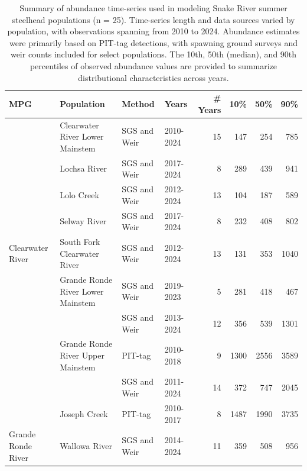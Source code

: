 \documentclass[12pt,a4paper]{article}
\begin{document}
\begin{table}
\centering
\caption{\label{tab:sth-obs}Summary of abundance time-series used in modeling Snake River summer steelhead populations (n = 25). Time-series length and data sources varied by population, with observations spanning from 2010 to 2024. Abundance estimates were primarily based on PIT-tag detections, with spawning ground surveys and weir counts included for select populations. The 10th, 50th (median), and 90th percentiles of observed abundance values are provided to summarize distributional characteristics across years.}
\centering
\fontsize{8}{10}\selectfont
\begin{tabular}[t]{llllrrrr}
\toprule
MPG & Population & Method & Years & \# Years & 10\% & 50\% & 90\%\\
\midrule
 & Clearwater River Lower Mainstem & SGS and Weir & 2010-2024 & 15 & 147 & 254 & 785\\

 & Lochsa River & SGS and Weir & 2017-2024 & 8 & 289 & 439 & 941\\

 & Lolo Creek & SGS and Weir & 2012-2024 & 13 & 104 & 187 & 589\\

 & Selway River & SGS and Weir & 2017-2024 & 8 & 232 & 408 & 802\\

\multirow[t]{-5}{*}[4\dimexpr\aboverulesep+\belowrulesep+\cmidrulewidth]{\raggedright\arraybackslash Clearwater River} & South Fork Clearwater River & SGS and Weir & 2012-2024 & 13 & 131 & 353 & 1040\\

 & Grande Ronde River Lower Mainstem & SGS and Weir & 2019-2023 & 5 & 281 & 418 & 467\\

 &  & SGS and Weir & 2013-2024 & 12 & 356 & 539 & 1301\\

 & \multirow[t]{-2}{*}{\raggedright\arraybackslash Grande Ronde River Upper Mainstem} & PIT-tag & 2010-2018 & 9 & 1300 & 2556 & 3589\\

 &  & SGS and Weir & 2011-2024 & 14 & 372 & 747 & 2045\\

 & \multirow[t]{-2}{*}{\raggedright\arraybackslash Joseph Creek} & PIT-tag & 2010-2017 & 8 & 1487 & 1990 & 3735\\

\multirow[t]{-6}{*}[3\dimexpr\aboverulesep+\belowrulesep+\cmidrulewidth]{\raggedright\arraybackslash Grande Ronde River} & Wallowa River & SGS and Weir & 2014-2024 & 11 & 359 & 508 & 956\\


\end{tabular}
\end{table}
\end{document}
